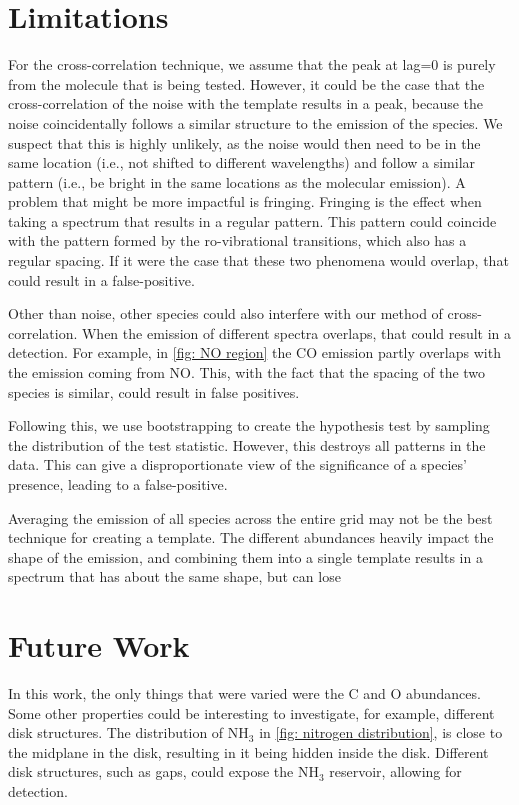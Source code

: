 \documentclass[twoside, single, authoryear, semicolon, 12pt]{lion-msc}
\newcommand{\4}{$_4$}
\newcommand{\3}{$_3$}
\newcommand{\2}{$_2$}
\begin{document}
\section{Limitations}
For the cross-correlation technique, we assume that the peak at lag=0 is purely from the molecule that is being tested. However, it could be the case that the cross-correlation of the noise with the template results in a peak, because the noise coincidentally follows a similar structure to the emission of the species. We suspect that this is highly unlikely, as the noise would then need to be in the same location (i.e., not shifted to different wavelengths) and follow a similar pattern (i.e., be bright in the same locations as the molecular emission). A problem that might be more impactful is fringing. Fringing is the effect when taking a spectrum that results in a regular pattern. This pattern could coincide with the pattern formed by the ro-vibrational transitions, which also has a regular spacing. If it were the case that these two phenomena would overlap, that could result in a false-positive.

Other than noise, other species could also interfere with our method of cross-correlation. When the emission of different spectra overlaps, that could result in a detection. For example, in \autoref{fig: NO region} the CO emission partly overlaps with the emission coming from NO. This, with the fact that the spacing of the two species is similar, could result in false positives. 

Following this, we use bootstrapping to create the hypothesis test by sampling the distribution of the test statistic. However, this destroys all patterns in the data. This can give a disproportionate view of the significance of a species' presence, leading to a false-positive.

Averaging the emission of all species across the entire grid may not be the best technique for creating a template. The different abundances heavily impact the shape of the emission, and combining them into a single template results in a spectrum that has about the same shape, but can lose 

\section{Future Work}
In this work, the only things that were varied were the C and O abundances. Some other properties could be interesting to investigate, for example, different disk structures. The distribution of NH\3 in \autoref{fig: nitrogen distribution}, is close to the midplane in the disk, resulting in it being hidden inside the disk. Different disk structures, such as gaps, could expose the NH\3 reservoir, allowing for detection. 
\end{document}
